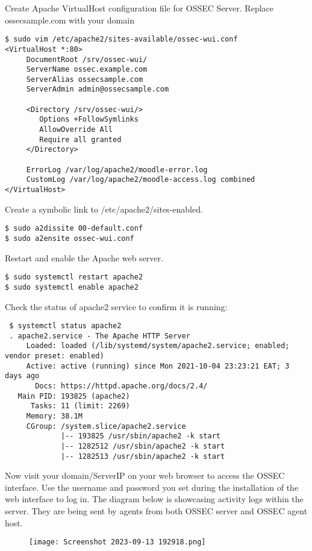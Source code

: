 \documentclass{article}
\begin{document}
Create Apache VirtualHost configuration file for OSSEC Server. Replace ossecsample.com with your domain
\begin{verbatim}
$ sudo vim /etc/apache2/sites-available/ossec-wui.conf
<VirtualHost *:80>
     DocumentRoot /srv/ossec-wui/
     ServerName ossec.example.com
     ServerAlias ossecsample.com
     ServerAdmin admin@ossecsample.com

     <Directory /srv/ossec-wui/>
        Options +FollowSymlinks
        AllowOverride All
        Require all granted
     </Directory>

     ErrorLog /var/log/apache2/moodle-error.log
     CustomLog /var/log/apache2/moodle-access.log combined
</VirtualHost>
\end{verbatim}

Create a symbolic link to /etc/apache2/sites-enabled.

\begin{verbatim}
$ sudo a2dissite 00-default.conf
$ sudo a2ensite ossec-wui.conf
\end{verbatim}
Restart and enable the Apache web server.

\begin{verbatim}
$ sudo systemctl restart apache2
$ sudo systemctl enable apache2
\end{verbatim}
Check the status of apache2 service to confirm it is running:

\begin{verbatim}
 $ systemctl status apache2 
 . apache2.service - The Apache HTTP Server
     Loaded: loaded (/lib/systemd/system/apache2.service; enabled; vendor preset: enabled)
     Active: active (running) since Mon 2021-10-04 23:23:21 EAT; 3 days ago
       Docs: https://httpd.apache.org/docs/2.4/
   Main PID: 193825 (apache2)
      Tasks: 11 (limit: 2269)
     Memory: 38.1M
     CGroup: /system.slice/apache2.service
             |-- 193825 /usr/sbin/apache2 -k start
             |-- 1282512 /usr/sbin/apache2 -k start
             |-- 1282513 /usr/sbin/apache2 -k start   
\end{verbatim}

Now visit your domain/ServerIP on your web browser to access the OSSEC interface.
Use the username and password you set during the installation of the web interface to log in.
The diagram below is showcasing activity logs within the server. They are being sent by agents from both OSSEC server and OSSEC agent host.

\begin{figure}
\centering
    \texttt{[image: Screenshot 2023-09-13 192918.png]}
\end{figure}
\end{document}
